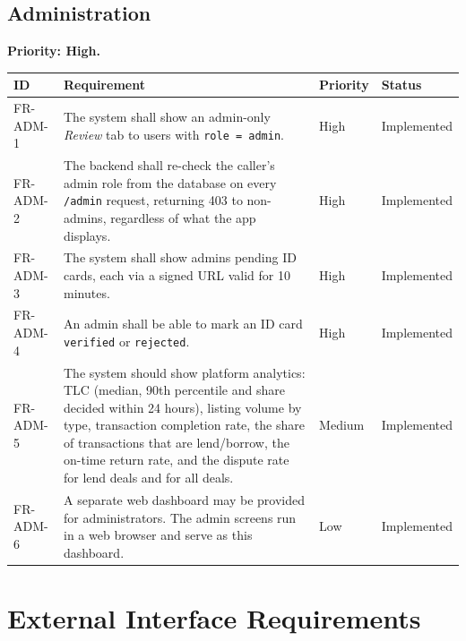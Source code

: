 \documentclass[11pt,a4paper]{scrreprt}
\newenvironment{reqtable}{%
  \small
  \begin{longtable}{>{\raggedright\arraybackslash\ttfamily\footnotesize}p{2.05cm} L{8.85cm} L{1.45cm} L{2.05cm}}
  \toprule
  \normalfont\normalsize\textbf{ID} & \textbf{Requirement} & \textbf{Priority} & \textbf{Status}\\
  \midrule\endhead
  \bottomrule\endfoot
}{\end{longtable}}
\newcommand{\impl}{Implemented}
\begin{document}
\section{Administration}
\textbf{Priority: High.}
\begin{reqtable}
FR-ADM-1 & The system shall show an admin-only \emph{Review} tab to users with \texttt{role = admin}. & High & \impl\\
FR-ADM-2 & The backend shall re-check the caller's admin role from the database on every \texttt{/admin} request, returning 403 to non-admins, regardless of what the app displays. & High & \impl\\
FR-ADM-3 & The system shall show admins pending ID cards, each via a signed URL valid for 10 minutes. & High & \impl\\
FR-ADM-4 & An admin shall be able to mark an ID card \texttt{verified} or \texttt{rejected}. & High & \impl\\
FR-ADM-5 & The system should show platform analytics: TLC (median, 90th percentile and share decided within 24 hours), listing volume by type, transaction completion rate, the share of transactions that are lend/borrow, the on-time return rate, and the dispute rate for lend deals and for all deals. & Medium & \impl\\
FR-ADM-6 & A separate web dashboard may be provided for administrators. The admin screens run in a web browser and serve as this dashboard. & Low & \impl\\
\end{reqtable}

\chapter{External Interface Requirements}
\end{document}
